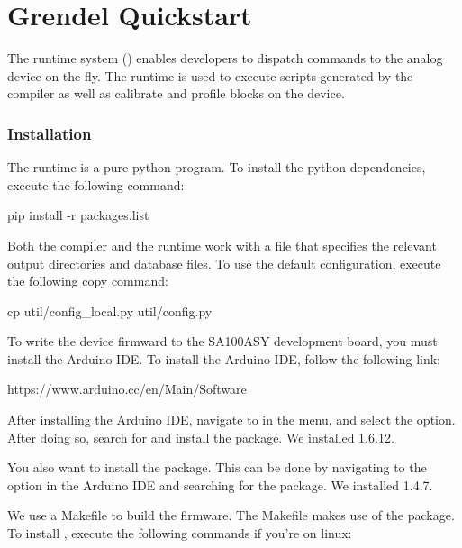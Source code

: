 \chapter{Grendel Quickstart}

The \grendel runtime system () enables developers to dispatch
commands to the \hcdc analog device on the fly. The \grendel runtime is used to
execute scripts generated by the \legno compiler as well as calibrate and profile
blocks on the device. 

\subsection{Installation}

The \grendel runtime is a pure python program. To install the python
dependencies, execute the following command:

\begin{snippet}
  pip install -r packages.list
\end{snippet}



Both the \legno compiler and the \grendel runtime work with a 
file that specifies the relevant output directories and database files. To use
the default configuration, execute the following copy command:

\begin{snippet}
cp util/config_local.py util/config.py
\end{snippet}


To write the device firmward to the SA100ASY development board, you must install the Arduino
IDE. To install the Arduino IDE, follow the following link:

\begin{snippet}
https://www.arduino.cc/en/Main/Software
\end{snippet}

After installing the Arduino IDE, navigate to  in the menu, and select the 
option. After doing so, search for  and install the  package.
We installed 1.6.12.

You also want to install the  package. This can be done by navigating to the 
 option in the Arduino IDE and searching for the  package.
We installed 1.4.7.

We use a Makefile to build the firmware. The Makefile makes use of the  package. To install 
, execute the following commands if you're on linux:

